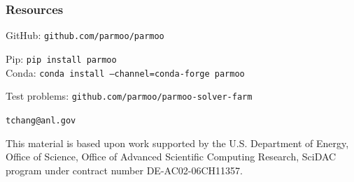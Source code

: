 \documentclass[aspectratio=169]{beamer}
\begin{document}
\begin{frame}\frametitle{Resources}
\begin{center}
{\large
GitHub: {\tt github.com/parmoo/parmoo}

\medskip

Pip: {\tt pip install parmoo}\\
Conda: {\tt conda install --channel=conda-forge parmoo}}

\bigskip
\bigskip

Test problems: {\tt github.com/parmoo/parmoo-solver-farm}

\bigskip
\bigskip

{\tt tchang@anl.gov}

\vfill

{\tiny This material is based upon work supported by the U.S. Department of Energy, Office of Science, Office of Advanced Scientific Computing Research, SciDAC program under contract number DE-AC02-06CH11357.\\}

\end{center}
\end{frame}
\end{document}
